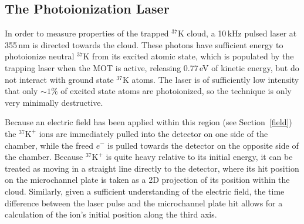 \subsection{The Photoionization Laser}
\label{cloud}
\label{photoions}

In order to measure properties of the trapped $^{37}\textrm{K}$ cloud, a 10\,kHz pulsed laser at 355\,nm is directed towards the cloud.  These photons have sufficient energy to photoionize neutral $^{37}\textrm{K}$ from its excited atomic state, which is populated by the trapping laser when the MOT is active, releasing 0.77\,eV of kinetic energy, but do not interact with ground state $^{37}\textrm{K}$ atoms.  The laser is of sufficiently low intensity that only $\sim 1\%$ of excited state atoms are photoionized, so the technique is only very minimally destructive.

Because an electric field has been applied within this region (see Section~\ref{field}) the $^{37}\textrm{K}^+$ ions are immediately pulled into the detector on one side of the chamber, while the freed $e^-$ is pulled towards the detector on the opposite side of the chamber.  Because  $^{37}\textrm{K}^+$ is quite heavy relative to its initial energy, it can be treated as moving in a straight line directly to the detector, where its hit position on the microchannel plate is taken as a 2D projection of its position within the cloud.  Similarly, given a sufficient understanding of the electric field, the time difference between the laser pulse and the microchannel plate hit allows for a calculation of the ion's initial position along the third axis.  



